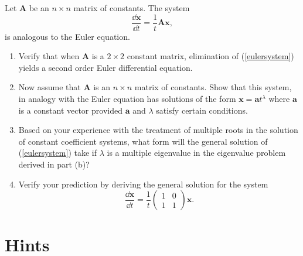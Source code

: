 {\begin{Exercise}
\end{Exercise}





\begin{Exercise}
  \label{exercise dxdt=1tAx}
  Let $\mathbf{A}$ be an $n \times n$ matrix of constants.  The system
  \begin{equation}
    \label{eulersystem}
    \frac{\dd \mathbf{x}}{\dd t} = \frac{1}{t} \mathbf{A} \mathbf{x},
  \end{equation}
  is analogous to the Euler equation.
  \begin{enumerate}
  \item
    Verify that when $\mathbf{A}$ is a $2 \times 2$ constant matrix, elimination of
    (\ref{eulersystem}) yields a second order Euler differential equation.
  \item
    Now assume that $\mathbf{A}$ is an $n \times n$ matrix of constants.  Show that
    this system, in analogy with the Euler equation has solutions of the form
    $\mathbf{x} = \mathbf{a} t^\lambda$ where $\mathbf{a}$ is a constant vector provided
    $\mathbf{a}$ and $\lambda$ satisfy certain conditions.
  \item
    Based on your experience with the treatment of multiple roots in the solution
    of constant coefficient systems, what form will the general solution of 
    (\ref{eulersystem}) take if $\lambda$ is a multiple eigenvalue in the 
    eigenvalue problem derived in part (b)?
  \item
    Verify your prediction by deriving the general solution for the system
    \[
    \frac{\dd \mathbf{x}}{\dd t} = \frac{1}{t} 
    \begin{pmatrix}
      1 & 0 \\
      1 & 1
    \end{pmatrix}
    \mathbf{x}.
    \]
  \end{enumerate}

\end{Exercise}











\raggedbottom
}
{
}
\pagebreak
\flushbottom
\section{Hints}




